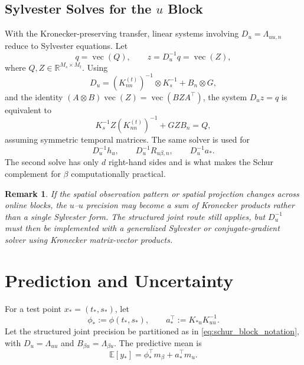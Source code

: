 \documentclass[12pt]{article}
\newtheorem{remark}{Remark}
\newcommand{\E}{\mathbb{E}}
\newcommand{\vecop}{\operatorname{vec}}
\begin{document}
\subsection{Sylvester Solves for the $u$ Block}
\label{subsec:sylvester_reformulation}

With the Kronecker-preserving transfer, linear systems involving
$D_u=\Lambda_{uu,n}$ reduce to Sylvester equations. Let
\begin{equation}
    q=\vecop(Q),
    \qquad
    z=D_u^{-1}q=\vecop(Z),
\end{equation}
where $Q,Z\in\mathbb{R}^{M_s\times M_t}$. Using
\begin{equation}
    D_u=(K_{nn}^{(t)})^{-1}\otimes K_s^{-1}+B_n\otimes G,
\end{equation}
and the identity $(A\otimes B)\vecop(Z)=\vecop(BZA^\top)$, the system
$D_uz=q$ is equivalent to
\begin{equation}
    K_s^{-1}Z(K_{nn}^{(t)})^{-1}+GZB_n=Q,
    \label{eq:sylvester_after_ssgp_transfer}
\end{equation}
assuming symmetric temporal matrices. The same solver is used for
\begin{equation}
    D_u^{-1}h_u,
    \qquad
    D_u^{-1}R_{u\beta,n},
    \qquad
    D_u^{-1}a_*.
\end{equation}
The second solve has only $d$ right-hand sides and is what makes the Schur complement
for $\beta$ computationally practical.

\begin{remark}
If the spatial observation pattern or spatial projection changes across online blocks,
the $u$--$u$ precision may become a sum of Kronecker products rather than a single
Sylvester form. The structured joint route still applies, but $D_u^{-1}$ must then be
implemented with a generalized Sylvester or conjugate-gradient solver using Kronecker
matrix-vector products.
\end{remark}


\section{Prediction and Uncertainty}
\label{sec:prediction_uncertainty}

For a test point $x_*=(t_*,s_*)$, let
\begin{equation}
    \phi_*:=\phi(t_*,s_*),
    \qquad
    a_*^\top:=K_{*u}K_{uu}^{-1}.
\end{equation}
Let the structured joint precision be partitioned as in
\eqref{eq:schur_block_notation}, with $D_u=\Lambda_{uu}$ and
$B_{\beta u}=\Lambda_{\beta u}$. The predictive mean is
\begin{equation}
    \E[y_*]
    =
    \phi_*^\top m_\beta+a_*^\top m_u.
    \label{eq:structured_predictive_mean}
\end{equation}
\end{document}

